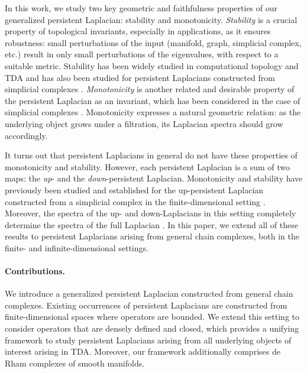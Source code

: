 \documentclass[11pt]{article}
\theoremstyle{definition}
\theoremstyle{remark}
\begin{document}
In this work, we study two key geometric and faithfulness properties of our generalized persistent Laplacian: stability and monotonicity.  \emph{Stability} is a crucial property of topological invariants, especially in applications, as it ensures robustness: small perturbations of the input (manifold, graph, simplicial complex, etc.) result in only small perturbations of the eigenvalues, with respect to a suitable metric. Stability has been widely studied in computational topology and TDA \citep[e.g.,][]{cohen-steiner_Stability_2017,stability3,stability1,stability4} and has also been studied for persistent Laplacians constructed from simplicial complexes \citep{mww}. \emph{Monotonicity} is another related and desirable property of the persistent Laplacian as an invariant, which has been considered in the case of simplicial complexes \citep{mww}.  Monotonicity expresses a natural geometric relation: as the underlying object grows under a filtration, its Laplacian spectra should grow accordingly.

It turns out that persistent Laplacians in general do not have these properties of monotonicity and stability. However, each persistent Laplacian is a sum of two maps: the \emph{up}- and the \emph{down}-persistent Laplacian. Monotonicity and stability have previously been studied and established for the up-persistent Laplacian constructed from a simplicial complex in the finite-dimensional setting \citep{mww}. Moreover, the spectra of the up- and down-Laplacians in this setting completely determine the spectra of the full Laplacian \citep{mww}. In this paper, we extend all of these results to persistent Laplacians arising from general chain complexes, both in the finite- and infinite-dimensional settings. 

\paragraph{Contributions.} We introduce a generalized persistent Laplacian constructed from general chain complexes.  Existing occurrences of persistent Laplacians \citep[see, e.g.,][]{survey} are constructed from finite-dimensional spaces where operators are bounded.  We extend this setting to consider operators that are densely defined and closed, which provides a unifying framework to study persistent Laplacians arising from all underlying objects of interest arising in TDA.  Moreover, our framework additionally comprises de Rham complexes of smooth manifolds.
\end{document}
